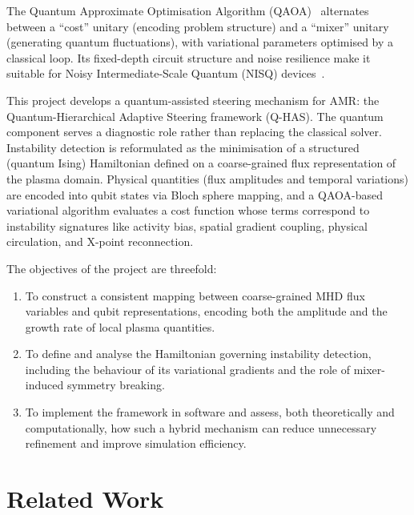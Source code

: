 \documentclass[12pt, a4paper, oneside]{report}
\begin{document}
The Quantum Approximate Optimisation Algorithm (QAOA)~\cite{farhi2014} alternates between a ``cost'' unitary (encoding problem structure) and a ``mixer'' unitary (generating quantum fluctuations), with variational parameters optimised by a classical loop. Its fixed-depth circuit structure and noise resilience make it suitable for Noisy Intermediate-Scale Quantum (NISQ) devices~\cite{preskill2018}.

This project develops a quantum-assisted steering mechanism for AMR: the Quantum-Hierarchical Adaptive Steering framework (Q-HAS). The quantum component serves a diagnostic role rather than replacing the classical solver. Instability detection is reformulated as the minimisation of a structured (quantum Ising) Hamiltonian defined on a coarse-grained flux representation of the plasma domain. Physical quantities (flux amplitudes and temporal variations) are encoded into qubit states via Bloch sphere mapping, and a QAOA-based variational algorithm evaluates a cost function whose terms correspond to instability signatures like activity bias, spatial gradient coupling, physical circulation, and X-point reconnection.

The objectives of the project are threefold:
\begin{enumerate}
    \item To construct a consistent mapping between coarse-grained MHD flux variables and qubit representations, encoding both the amplitude and the growth rate of local plasma quantities.
    \item To define and analyse the Hamiltonian governing instability detection, including the behaviour of its variational gradients and the role of mixer-induced symmetry breaking.
    \item To implement the framework in software and assess, both theoretically and computationally, how such a hybrid mechanism can reduce unnecessary refinement and improve simulation efficiency.
\end{enumerate}

\section*{Related Work}
\end{document}
